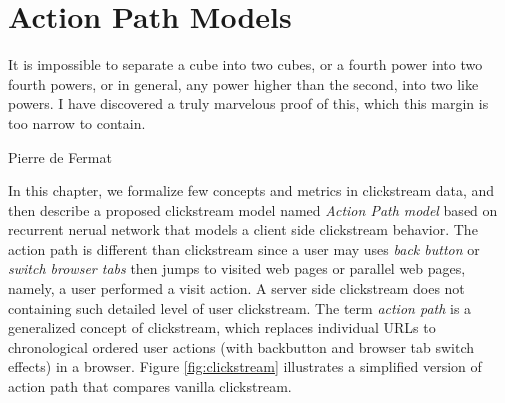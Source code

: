 \section{Action Path Models}
\label{ch:model}

\epigraph{It is impossible to separate a cube into two cubes, or a fourth power into two fourth powers, or in general, any power higher than the second, into two like powers. I have discovered a truly marvelous proof of this, which this margin is too narrow to contain.}{Pierre de Fermat}

In this chapter, we formalize few concepts and metrics in clickstream data,
and then describe a proposed clickstream model named \emph{Action Path model} 
based on recurrent nerual network that models a client side clickstream behavior. 
The action path is different than clickstream since 
a user may uses \emph{back button} or \emph{switch browser tabs} then jumps to visited web pages 
or parallel web pages, namely, a user performed a visit action.
A server side clickstream does not containing such detailed level of user clickstream. 
The term \emph{action path} is a generalized concept of clickstream, which replaces individual URLs 
to chronological ordered user actions (with backbutton and browser tab switch effects) in a browser. 
Figure \ref{fig:clickstream} illustrates a simplified version of action path that 
compares vanilla clickstream.

